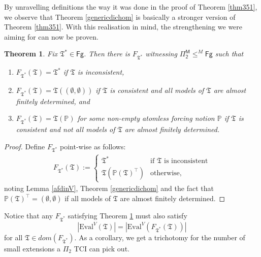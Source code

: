 \documentclass[12pt, twoside]{memoir}
\numberwithin{equation}{section}
\newtheorem{thm}{Theorem}[section]
\theoremstyle{definition}
\theoremstyle{remark}
\theoremstyle{definition}
\theoremstyle{definition}
\theoremstyle{definition}
\theoremstyle{remark}
\begin{document}
By unravelling definitions the way it was done in the proof of Theorem \ref{thm351}, we observe that Theorem \ref{genericdichom} is basically a stronger version of Theorem \ref{thm351}. With this realisation in mind, the strengthening we were aiming for can now be proven.

\begin{thm}\label{thm368}
Fix $\mathfrak{T}^* \in \mathsf{Fg}$. Then there is $F_{\mathfrak{T}^*}$ witnessing $\mathsf{\Pi^M_2} \leq^M \mathsf{Fg}$ such that
\begin{enumerate}[label=(\arabic*)]
    \item $F_{\mathfrak{T}^*}(\mathfrak{T}) = \mathfrak{T}^*$ if $\mathfrak{T}$ is inconsistent,
    \item $F_{\mathfrak{T}^*}(\mathfrak{T}) = \mathfrak{T}((\emptyset, \emptyset))$ if $\mathfrak{T}$ is consistent and all models of $\mathfrak{T}$ are almost finitely determined, and
    \item $F_{\mathfrak{T}^*}(\mathfrak{T}) = \mathfrak{T}(\mathbb{P})$ for some non-empty atomless forcing notion $\mathbb{P}$ if $\mathfrak{T}$ is consistent and not all models of $\mathfrak{T}$ are almost finitely determined.
\end{enumerate}
\end{thm}

\begin{proof}
Define $F_{\mathfrak{T}^*}$ point-wise as follows:
\begin{align*}
    F_{\mathfrak{T}^*}(\mathfrak{T}) :=  
    \begin{cases}
        \mathfrak{T}^* & \text{if } \mathfrak{T} \text{ is inconsistent} \\
        \mathfrak{T}(\mathbb{P}(\mathfrak{T})^{\top}) & \text{otherwise,}
    \end{cases}
\end{align*}
noting Lemma \ref{afdinV}, Theorem \ref{genericdichom} and the fact that $\mathbb{P}(\mathfrak{T})^{\top} = (\emptyset, \emptyset)$ if all models of $\mathfrak{T}$ are almost finitely determined.
\end{proof}

Notice that any $F_{\mathfrak{T}^*}$ satisfying Theorem \ref{thm368} must also satisfy
\begin{equation*}
    |\mathrm{Eval}^V(\mathfrak{T})| = |\mathrm{Eval}^V(F_{\mathfrak{T}^*}(\mathfrak{T}))|
\end{equation*}
for all $\mathfrak{T} \in dom(F_{\mathfrak{T}^*})$. As a corollary, we get a trichotomy for the number of small extensions a $\Pi_2$ TCI can pick out.
\end{document}
